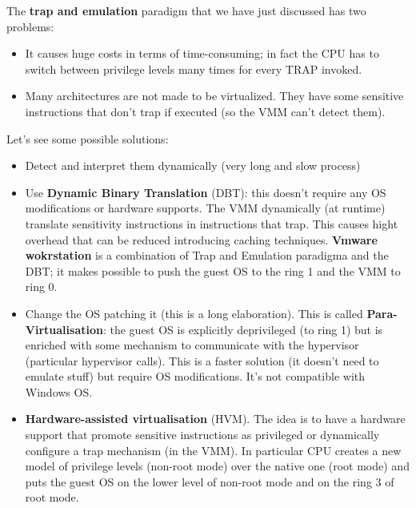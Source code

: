 The \textbf{trap and emulation} paradigm that we have just discussed has two problems:
\begin{itemize}
    \item It causes huge costs in terms of time-consuming; in fact the CPU has to switch between privilege levels many times for every TRAP invoked.
    \item Many architectures are not made to be virtualized. They have some sensitive instructions that don't trap if executed (so the VMM can't detect them).
\end{itemize}
Let's see some possible solutions:
\begin{itemize}
    \item Detect and interpret them dynamically (very long and slow process)
    \item Use \textbf{Dynamic Binary Translation} (DBT): this doesn't require any OS modifications or hardware supports. The VMM dynamically (at runtime) translate sensitivity instructions in instructions that trap. This causes hight overhead that can be reduced introducing caching techniques. \textbf{Vmware wokrstation} is a combination of Trap and Emulation paradigma and the DBT; it makes possible to push the guest OS to the ring 1 and the VMM to ring 0.
    \item Change the OS patching it (this is a long elaboration). This is called \textbf{Para-Virtualisation}: the guest OS is explicitly deprivileged (to ring 1) but is enriched with some mechanism to communicate with the hypervisor (particular hypervisor calls). This is a faster solution (it doesn't need to emulate stuff) but require OS modifications. It's not compatible with Windows OS.
    \item \textbf{Hardware-assisted virtualisation} (HVM). The idea is to have a hardware support that promote sensitive instructions as privileged or dynamically configure a trap mechanism (in the VMM). In particular CPU creates a new model of privilege levels (non-root mode) over the native one (root mode) and puts the guest OS on the lower level of non-root mode and on the ring 3 of root mode.
    \begin{figure}[H]
        \centering

\end{figure}
\end{itemize}
